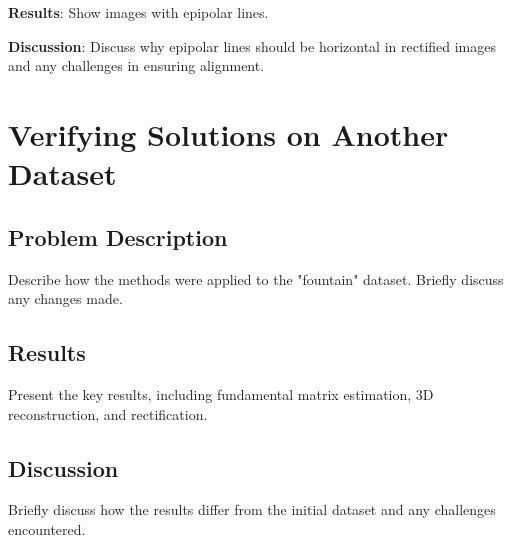 \documentclass{article}
\begin{document}
\textbf{Results}: Show images with epipolar lines.


\textbf{Discussion}: Discuss why epipolar lines should be horizontal in rectified images and any challenges in ensuring alignment.

\section{Verifying Solutions on Another Dataset}
\subsection{Problem Description}
Describe how the methods were applied to the "fountain" dataset. Briefly discuss any changes made.

\subsection{Results}
Present the key results, including fundamental matrix estimation, 3D reconstruction, and rectification.

\subsection{Discussion}
Briefly discuss how the results differ from the initial dataset and any challenges encountered.
\end{document}
